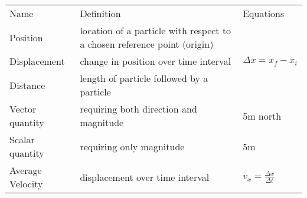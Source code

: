 \documentclass[11pt]{article}
\begin{document}
\begin{table}
    \begin{tabularx}{\textwidth}{l |X l}
		Name & Definition & Equations \\
		Position & location of a particle with  respect to a chosen reference point (origin) & \\
		Displacement & change in position over time interval & $ \Delta x=x_{f} - x_{i} $ \\
		Distance & length of particle followed by a particle & \\
		Vector quantity & requiring both direction and magnitude & 5m north \\
		Scalar quantity & requiring only magnitude & 5m \\
        Average Velocity & displacement over time interval & $ v_{x} = \frac{ \Delta x}{ \Delta t } $ \\
	\end{tabularx}
\end{table}
\end{document}
